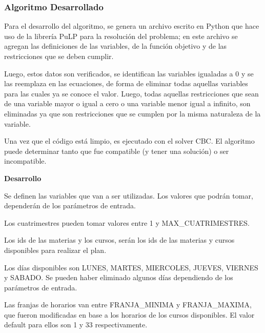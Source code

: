 \documentclass[a4paper]{article}
\begin{document}
\subsubsection{Algoritmo Desarrollado}

Para el desarrollo del algoritmo, se genera un archivo escrito en Python que hace uso de la librería PuLP para la resolución del problema; en este archivo se agregan las definiciones de las variables, de la función objetivo y de las restricciones que se deben cumplir.

Luego, estos datos son verificados, se identifican las variables igualadas a 0 y se las reemplaza en las ecuaciones, de forma de eliminar todas aquellas variables para las cuales ya se conoce el valor. Luego, todas aquellas restricciones que sean de una variable mayor o igual a cero o una variable menor igual a infinito, son eliminadas ya que son restricciones que se cumplen por la misma naturaleza de la variable.

Una vez que el código está limpio, es ejecutado con el solver CBC. El algoritmo puede determinar tanto que fue compatible (y tener una solución) o ser incompatible.\newline

\textbf{Desarrollo}\newline

Se definen las variables que van a ser utilizadas. Los valores que podrán tomar, dependerán de los parámetros de entrada.\newline

Los cuatrimestres pueden tomar valores entre 1 y MAX\_CUATRIMESTRES.

Los ids de las materias y los cursos, serán los ids de las materias y cursos disponibles para realizar el plan.\newline

Los días disponibles son LUNES, MARTES, MIERCOLES, JUEVES, VIERNES y SABADO. Se pueden haber eliminado algunos días dependiendo de los parámetros de entrada.\newline

Las franjas de horarios van entre FRANJA\_MINIMA y FRANJA\_MAXIMA, que fueron modificadas en base a los horarios de los cursos disponibles. El valor default para ellos son 1 y 33 respectivamente.
\end{document}
